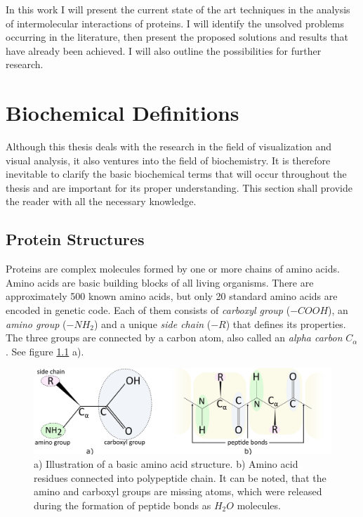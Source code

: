 In this work I will present the current state of the art techniques in the analysis of intermolecular interactions of proteins. I will identify the unsolved problems occurring in the literature, then present the proposed solutions and results that have already been achieved. I will also outline the possibilities for further research.



\chapter{Biochemical Definitions}
\label{Sec:Chem}
Although this thesis deals with the research in the field of visualization and visual analysis, it also ventures into the field of biochemistry. It is therefore inevitable to clarify the basic biochemical terms that will occur throughout the thesis and are important for its proper understanding. This section shall provide the reader with all the necessary knowledge.

\section{Protein Structures}
Proteins are complex molecules formed by one or more chains of amino acids. Amino acids are basic building blocks of all living organisms. There are approximately 500 known amino acids, but only 20 standard amino acids are encoded in genetic code. Each of them consists of \textit{carboxyl group} ($-COOH$), an \textit{amino group} ($-NH_2$) and a unique \textit{side chain} ($-R$) that defines its properties. The three groups are connected by a carbon atom, also called an \textit{alpha carbon} $C_\alpha$. See figure \ref{Fig:aa} a).

\begin{figure}[H]
  \centering
  \includegraphics[width=\textwidth]{pictures/aminoacid.pdf} 
  \caption{a) Illustration of a basic amino acid structure. b) Amino acid residues connected into polypeptide chain. It can be noted, that the amino and carboxyl groups are missing atoms, which were released during the formation of peptide bonds as $H_2O$ molecules.}
  \label{Fig:aa}
\end{figure}

